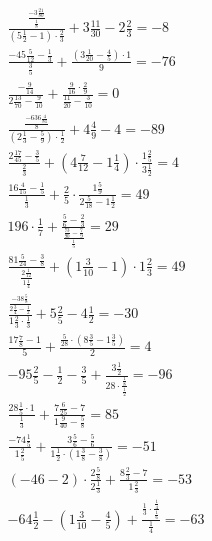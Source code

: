 \documentclass{article}
\begin{document}
\begin{gather}
    \frac{\frac{-3\frac{21}{80}}{\frac{1}{8}}}{\left(5\frac{1}{2} - 1\right) \cdot \frac{2}{3}} + 3\frac{11}{30} - 2\frac{2}{3} = -8 \\
    \frac{-45\frac{5}{12} - \frac{1}{3}}{\frac{3}{5}} + \frac{\left(3\frac{1}{20} - \frac{4}{5}\right) \cdot 1}{9} = -76 \\
    \frac{-\frac{9}{14}}{2\frac{13}{70} - \frac{9}{10}} + \frac{\frac{9}{16} \cdot \frac{2}{9}}{\frac{11}{20} - \frac{3}{10}} = 0 \\
    \frac{\frac{-636\frac{4}{81}}{8}}{\left(2\frac{1}{3} - \frac{5}{9}\right) \cdot \frac{1}{2}} + 4\frac{4}{9} - 4 = -89 \\
    \frac{2\frac{17}{45} - \frac{3}{5}}{\frac{2}{3}} + \left(4\frac{7}{12} - 1\frac{1}{4}\right) \cdot \frac{1\frac{2}{5}}{3\frac{1}{2}} = 4 \\
    \frac{16\frac{4}{15} - \frac{1}{5}}{\frac{1}{3}} + \frac{2}{5} \cdot \frac{1\frac{5}{9}}{2\frac{5}{18} - 1\frac{1}{2}} = 49 \\
    196 \cdot \frac{1}{7} + \frac{\frac{5}{6} - \frac{2}{3}}{\frac{\frac{73}{90} - \frac{7}{9}}{\frac{1}{5}}} = 29 \\
    \frac{81\frac{5}{24} - \frac{3}{8}}{\frac{2\frac{1}{12}}{1\frac{1}{4}}} + \left(1\frac{3}{10} - 1\right) \cdot 1\frac{2}{3} = 49 \\
    \frac{\frac{-38\frac{5}{8}}{2\frac{3}{4} - \frac{1}{2}}}{1\frac{2}{3} \cdot \frac{1}{3}} + 5\frac{2}{5} - 4\frac{1}{2} = -30 \\
    \frac{17\frac{7}{8} - 1}{5} + \frac{\frac{5}{28} \cdot \left(8\frac{3}{5} - 1\frac{3}{5}\right)}{2} = 4 \\
    -95\frac{2}{5} - \frac{1}{2} - \frac{3}{5} + \frac{3\frac{1}{2}}{28 \cdot \frac{\frac{1}{8}}{\frac{1}{2}}} = -96 \\
    \frac{28\frac{1}{5} \cdot 1}{\frac{1}{3}} + \frac{7\frac{6}{25} - 7}{1\frac{9}{40} - \frac{5}{8}} = 85 \\
    \frac{-74\frac{1}{5}}{1\frac{2}{5}} + \frac{3\frac{5}{6} - \frac{5}{6}}{1\frac{1}{2} \cdot \left(1\frac{3}{8} - \frac{3}{8}\right)} = -51 \\
    \left(-46 - 2\right) \cdot \frac{2\frac{5}{8}}{2\frac{1}{3}} + \frac{8\frac{2}{3} - 7}{1\frac{2}{3}} = -53 \\
    -64\frac{1}{2} - \left(1\frac{3}{10} - \frac{4}{5}\right) + \frac{\frac{1}{3} \cdot \frac{\frac{1}{4}}{\frac{1}{6}}}{\frac{1}{4}} = -63
\end{gather}
\end{document}
